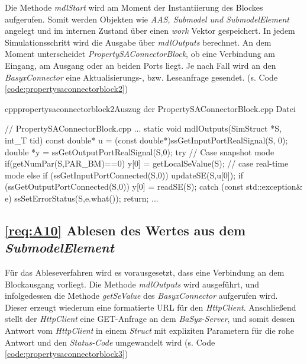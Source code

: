 
Die Methode \textit{mdlStart} wird am Moment der Instantiierung des Blockes aufgerufen. Somit werden Objekten wie \textit{AAS, Submodel und SubmodelElement} angelegt und im internen Zustand über einen \textit{work} Vektor gespeichert.
In jedem Simulationsschritt wird die Ausgabe über \textit{mdlOutputs} berechnet. An dem Moment unterscheidet \textit{PropertySAConnectorBlock}, ob eine Verbindung am Eingang, am Ausgang oder an beiden Ports liegt. Je nach Fall wird an den \textit{BasyxConnector} eine Aktualisierungs-, bzw. Leseanfrage gesendet. (s. Code \ref{code:propertysaconnectorblock2})

\begin{codeblock}{cpp}{propertysaconnectorblock2}{Auszug der PropertySAConnectorBlock.cpp Datei}

    // PropertySAConnectorBlock.cpp
    ...
    static void mdlOutputs(SimStruct *S, int_T tid)
    {    
        const double* u = (const double*)ssGetInputPortRealSignal(S, 0);
        double       *y = ssGetOutputPortRealSignal(S,0);
        try{
          // Case snapshot mode
          if(getNumPar(S,PAR_BM)==0){
            y[0] = getLocalSeValue(S);
          }// case real-time mode
          else{ 
            if (ssGetInputPortConnected(S,0)) updateSE(S,u[0]);      
            if (ssGetOutputPortConnected(S,0)) y[0] = readSE(S);
          }
        }catch (const std::exception& e){
            ssSetErrorStatus(S,e.what());
            return;
        }
    }
    ...
\end{codeblock}



\subsection{\ref{req:A10} Ablesen des Wertes aus dem \textit{SubmodelElement}}

Für das Ableseverfahren wird es vorausgesetzt, dass eine Verbindung an dem Blockausgang vorliegt. Die Methode \textit{mdlOutputs} wird ausgeführt, und infolgedessen die Methode \textit{getSeValue} des \textit{BasyxConnector} aufgerufen wird. Dieser erzeugt wiederum eine formatierte URL für den \textit{HttpClient}. Anschließend stellt der \textit{HttpClient} eine GET-Anfrage an dem \textit{BaSyx-Server}, und somit dessen Antwort vom \textit{HttpClient} in einem \textit{Struct} mit expliziten Parametern für die rohe Antwort und den \textit{Status-Code} umgewandelt wird (s. Code \ref{code:propertysaconnectorblock3})

